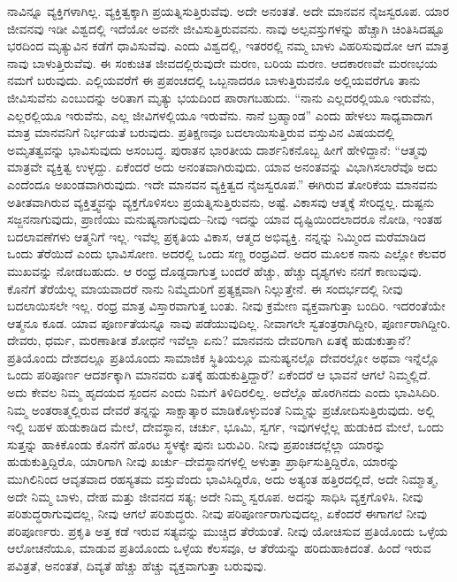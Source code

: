 ನಾವಿನ್ನೂ ವ್ಯಕ್ತಿಗಳಾಗಿಲ್ಲ. ವ್ಯಕ್ತಿತ್ವಕ್ಕಾಗಿ ಪ್ರಯತ್ನಿಸುತ್ತಿರುವೆವು. ಅದೇ ಅನಂತತೆ. ಅದೇ ಮಾನವನ ನೈಜಸ್ವರೂಪ. ಯಾರ ಜೀವನವು ಇಡೀ ವಿಶ್ವದಲ್ಲಿ ಇದೆಯೋ ಅವನೇ ಜೀವಿಸುತ್ತಿರುವವನು. ನಾವು ಅಲ್ಪವಸ್ತುಗಳನ್ನು ಹೆಚ್ಚಾಗಿ ಚಿಂತಿಸಿದಷ್ಟೂ ಭರದಿಂದ ಮೃತ್ಯುವಿನ ಕಡೆಗೆ ಧಾವಿಸುವೆವು. ಎಂದು ವಿಶ್ವದಲ್ಲಿ, ಇತರರಲ್ಲಿ ನಮ್ಮ ಬಾಳು ವಿಹರಿಸುವುದೋ ಆಗ ಮಾತ್ರ ನಾವು ಬಾಳುತ್ತಿರುವೆವು. ಈ ಸಂಕುಚಿತ ಜೀವದಲ್ಲಿರುವುದೇ ಮರಣ, ಬರಿಯ ಮರಣ. ಆದಕಾರಣವೇ ಮರಣಭಯ ನಮಗೆ ಬರುವುದು. ಎಲ್ಲಿಯವರೆಗೆ ಈ ಪ್ರಪಂಚದಲ್ಲಿ ಒಬ್ಬನಾದರೂ ಬಾಳುತ್ತಿರುವನೊ ಅಲ್ಲಿಯವರೆಗೂ ತಾನು ಜೀವಿಸುವೆನು ಎಂಬುದನ್ನು ಅರಿತಾಗ ಮೃತ್ಯು ಭಯದಿಂದ ಪಾರಾಗಬಹುದು. “ನಾನು ಎಲ್ಲದರಲ್ಲಿಯೂ ಇರುವೆನು, ಎಲ್ಲರಲ್ಲಿಯೂ ಇರುವೆನು, ಎಲ್ಲ ಜೀವಿಗಳಲ್ಲಿಯೂ ಇರುವೆನು. ನಾನೆ ಬ್ರಹ್ಮಾಂಡ” ಎಂದು ಹೇಳಲು ಸಾಧ್ಯವಾದಾಗ ಮಾತ್ರ ಮಾನವನಿಗೆ ನಿರ್ಭಯತೆ ಬರುವುದು. ಪ್ರತಿಕ್ಷಣವೂ ಬದಲಾಯಿಸುತ್ತಿರುವ ವಸ್ತುವಿನ ವಿಷಯದಲ್ಲಿ ಅಮೃತತ್ವವನ್ನು ಭಾವಿಸುವುದು ಅಸಂಬದ್ಧ. ಪುರಾತನ ಭಾರತೀಯ ದಾರ್ಶನಿಕನೊಬ್ಬ ಹೀಗೆ ಹೇಳಿದ್ದಾನೆ: “ಆತ್ಮವು ಮಾತ್ರವೇ ವ್ಯಕ್ತಿತ್ವ ಉಳ್ಳದ್ದು. ಏಕೆಂದರೆ ಅದು ಅನಂತವಾಗಿರುವುದು. ಯಾವ ಅನಂತವನ್ನು ವಿಭಾಗಿಸಲಾರೆವೊ ಅದು ಎಂದೆಂದೂ ಅಖಂಡವಾಗಿರುವುದು. ಇದೇ ಮಾನವನ ವ್ಯಕ್ತಿತ್ವದ ನೈಜಸ್ವರೂಪ.” ಈಗಿರುವ ತೋರಿಕೆಯ ಮಾನವನು ಅತೀತವಾಗಿರುವ ವ್ಯಕ್ತಿತ್ತ್ವವನ್ನು ವ್ಯಕ್ತಗೊಳಿಸಲು ಪ್ರಯತ್ನಿಸುತ್ತಿರುವನು, ಅಷ್ಟೆ. ವಿಕಾಸವು ಆತ್ಮಕ್ಕೆ ಸೇರಿದ್ದಲ್ಲ. ದುಷ್ಟನು ಸಜ್ಜನನಾಗುವುದು, ಪ್ರಾಣಿಯು ಮನುಷ್ಯನಾಗುವುದು–ನೀವು ಇದನ್ನು ಯಾವ ದೃಷ್ಟಿಯಿಂದಲಾದರೂ ನೋಡಿ, ಇಂತಹ ಬದಲಾವಣೆಗಳು ಆತ್ಮನಿಗೆ ಇಲ್ಲ. ಇವೆಲ್ಲ ಪ್ರಕೃತಿಯ ವಿಕಾಸ, ಆತ್ಮದ ಅಭಿವ್ಯಕ್ತಿ. ನನ್ನನ್ನು ನಿಮ್ಮಿಂದ ಮರೆಮಾಡಿದ ಒಂದು ತೆರೆಯಿದೆ ಎಂದು ಭಾವಿಸೋಣ. ಅದರಲ್ಲಿ ಒಂದು ಸಣ್ಣ ರಂಧ್ರವಿದೆ. ಅದರ ಮೂಲಕ ನಾನು ಎಲ್ಲೋ ಕೆಲವರ ಮುಖವನ್ನು ನೋಡಬಹುದು. ಆ ರಂಧ್ರ ದೊಡ್ಡದಾಗುತ್ತ ಬಂದರೆ ಹೆಚ್ಚು, ಹೆಚ್ಚು ದೃಶ್ಯಗಳು ನನಗೆ ಕಾಣುವುವು. ಕೊನೆಗೆ ತೆರೆಯೆಲ್ಲ ಮಾಯವಾದರೆ ನಾನು ನಿಮ್ಮೆದುರಿಗೆ ಪ್ರತ್ಯಕ್ಷವಾಗಿ ನಿಲ್ಲುತ್ತೇನೆ. ಈ ಸಂದರ್ಭದಲ್ಲಿ ನೀವು ಬದಲಾಯಿಸಲೇ ಇಲ್ಲ. ರಂಧ್ರ ಮಾತ್ರ ವಿಸ್ತಾರವಾಗುತ್ತ ಬಂತು. ನೀವು ಕ್ರಮೇಣ ವ್ಯಕ್ತವಾಗುತ್ತಾ ಬಂದಿರಿ. ಇದರಂತೆಯೇ ಆತ್ಮನೂ ಕೂಡ. ಯಾವ ಪೂರ್ಣತೆಯನ್ನೂ ನಾವು ಪಡೆಯುವುದಿಲ್ಲ. ನೀವಾಗಲೇ ಸ್ವತಂತ್ರರಾಗಿದ್ದೀರಿ, ಪೂರ್ಣರಾಗಿದ್ದೀರಿ. ದೇವರು, ಧರ್ಮ, ಮರಣಾತೀತ ಶೋಧನೆ ಇವೆಲ್ಲಾ ಏನು? ಮಾನವನು ದೇವರಿಗಾಗಿ ಏತಕ್ಕೆ ಹುಡುಕುತ್ತಾನೆ? ಪ್ರತಿಯೊಂದು ದೇಶದಲ್ಲೂ ಪ್ರತಿಯೊಂದು ಸಾಮಾಜಿಕ ಸ್ಥಿತಿಯಲ್ಲೂ ಮನುಷ್ಯನಲ್ಲೊ ದೇವರಲ್ಲೋ ಅಥವಾ ಇನ್ನೆಲ್ಲೊ ಒಂದು ಪರಿಪೂರ್ಣ ಆದರ್ಶಕ್ಕಾಗಿ ಮಾನವರು ಏತಕ್ಕೆ ಹುಡುಕುತ್ತಿದ್ದಾರೆ? ಏಕೆಂದರೆ ಆ ಭಾವನೆ ಆಗಲೆ ನಿಮ್ಮಲ್ಲಿದೆ. ಅದು ಕೇವಲ ನಿಮ್ಮ ಹೃದಯದ ಸ್ಪಂದನ ಎಂದು ನಿಮಗೆ ತಿಳಿದಿರಲಿಲ್ಲ. ಅದೆಲ್ಲೊ ಹೊರಗಿನದು ಎಂದು ಭಾವಿಸಿದಿರಿ. ನಿಮ್ಮ ಅಂತರಾತ್ಮಲ್ಲಿರುವ ದೇವರೆ ತನ್ನನ್ನು ಸಾಕ್ಷಾತ್ಕಾರ ಮಾಡಿಕೊಳ್ಳುವಂತೆ ನಿಮ್ಮನ್ನು ಪ್ರಚೋದಿಸುತ್ತಿರುವುದು. ಅಲ್ಲಿ ಇಲ್ಲಿ ಬಹಳ ಹುಡುಕಾಡಿದ ಮೇಲೆ, ದೇವಸ್ಥಾನ, ಚರ್ಚು, ಭೂಮಿ, ಸ್ವರ್ಗ, ಇವುಗಳಲ್ಲೆಲ್ಲ ಹುಡುಕಿದ ಮೇಲೆ, ಒಂದು ಸುತ್ತನ್ನು ಹಾಕಿಕೊಂಡು ಕೊನೆಗೆ ಹೊರಟ ಸ್ಥಳಕ್ಕೇ ಪುನಃ ಬರುವಿರಿ. ನೀವು ಪ್ರಪಂಚದಲ್ಲೆಲ್ಲಾ ಯಾರನ್ನು ಹುಡುಕುತ್ತಿದ್ದಿರೊ, ಯಾರಿಗಾಗಿ ನೀವು ಖರ್ಚು–ದೇವಸ್ಥಾನಗಳಲ್ಲಿ ಅಳುತ್ತಾ ಪ್ರಾರ್ಥಿಸುತ್ತಿದ್ದಿರೊ, ಯಾರನ್ನು ಮುಗಿಲಿನಿಂದ ಆವೃತವಾದ ರಹಸ್ಯತಮ ವಸ್ತುವೆಂದು ಭಾವಿಸಿದ್ದಿರೊ, ಅದು ಅತ್ಯಂತ ಹತ್ತಿರದಲ್ಲಿದೆ, ಅದೇ ನಿಮ್ಮಾತ್ಮ, ಅದೇ ನಿಮ್ಮ ಬಾಳು, ದೇಹ ಮತ್ತು ಜೀವನದ ಸತ್ಯ; ಅದೇ ನಿಮ್ಮ ಸ್ವರೂಪ. ಅದನ್ನು ಸಾಧಿಸಿ ವ್ಯಕ್ತಗೊಳಿಸಿ. ನೀವು ಪರಿಶುದ್ಧರಾಗುವುದಲ್ಲ, ನೀವು ಆಗಲೆ ಪರಿಶುದ್ಧರು. ನೀವು ಪರಿಪೂರ್ಣರಾಗುವುದಲ್ಲ, ಏಕೆಂದರೆ ಈಗಾಗಲೆ ನೀವು ಪರಿಪೂರ್ಣರು. ಪ್ರಕೃತಿ ಅತ್ತ ಕಡೆ ಇರುವ ಸತ್ಯವನ್ನು ಮುಚ್ಚಿದ ತೆರೆಯಂತೆ. ನೀವು ಯೋಚಿಸುವ ಪ್ರತಿಯೊಂದು ಒಳ್ಳೆಯ ಆಲೋಚನೆಯೂ, ಮಾಡುವ ಪ್ರತಿಯೊಂದು ಒಳ್ಳೆಯ ಕೆಲಸವೂ, ಆ ತೆರೆಯನ್ನು ಹರಿದುಹಾಕಿದಂತೆ. ಹಿಂದೆ ಇರುವ ಪವಿತ್ರತೆ, ಅನಂತತೆ, ದಿವ್ಯತೆ ಹೆಚ್ಚು ಹೆಚ್ಚು ವ್ಯಕ್ತವಾಗುತ್ತಾ ಬರುವುವು.

